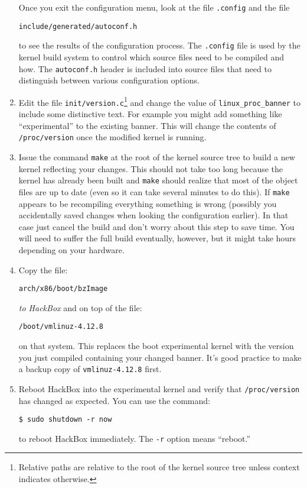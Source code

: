\documentclass[twocolumn]{article}
\begin{document}
\begin{enumerate}
  Once you exit the configuration menu, look at the file \texttt{.config} and the file
\begin{Verbatim}
include/generated/autoconf.h
\end{Verbatim}
  to see the results of the configuration process. The \texttt{.config} file is used by the
  kernel build system to control which source files need to be compiled and how. The
  \texttt{autoconf.h} header is included into source files that need to distinguish between
  various configuration options.

\item Edit the file \texttt{init/version.c}\footnote{Relative paths are relative to the root of
    the kernel source tree unless context indicates otherwise.} and change the value of
  \texttt{linux\_proc\_banner} to include some distinctive text. For example you might add
  something like ``experimental'' to the existing banner. This will change the contents of
  \texttt{/proc/version} once the modified kernel is running.

\item Issue the command \texttt{make} at the root of the kernel source tree to build a new
  kernel reflecting your changes. This should not take too long because the kernel has already
  been built and \texttt{make} should realize that most of the object files are up to date (even
  so it can take several minutes to do this). If \texttt{make} appears to be recompiling
  everything something is wrong (possibly you accidentally saved changes when looking the
  configuration earlier). In that case just cancel the build and don't worry about this step to
  save time. You will need to suffer the full build eventually, however, but it might take hours
  depending on your hardware.

\item Copy the file:
\begin{Verbatim}
arch/x86/boot/bzImage
\end{Verbatim}
  \emph{to HackBox} and on top of the file:
\begin{Verbatim}
/boot/vmlinuz-4.12.8
\end{Verbatim}
  on that system. This replaces the boot experimental kernel with the version you just compiled
  containing your changed banner. It's good practice to make a backup copy of
  \texttt{vmlinuz-4.12.8} first.

\item Reboot HackBox into the experimental kernel and verify that \texttt{/proc/version} has
  changed as expected. You can use the command:
\begin{Verbatim}
$ sudo shutdown -r now
\end{Verbatim}
  to reboot HackBox immediately. The \texttt{-r} option means ``reboot.''

\end{enumerate}
\end{document}

